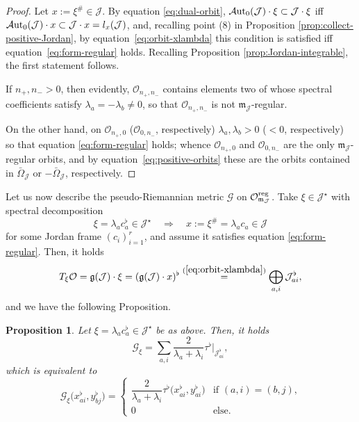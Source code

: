 \documentclass[10pt,a4paper]{amsart}
\numberwithin{equation}{section}
\newtheorem{Proposition}[Theorem]{Proposition}
 { \theoremstyle{definition}
\newtheorem{Definition}[Theorem]{Definition}
\newtheorem{Note}[Theorem]{Note}
\newtheorem{Example}[Theorem]{Example}
\newtheorem{Remark}[Theorem]{Remark} }
\newcommand{\be}{\begin{equation}}
\newcommand{\ee}{\end{equation}}
\newcommand{\Aut}{\mathcal{A}{\rm ut}}
\newcommand{\ocal}{\mathcal{O}}
\newcommand{\Jcal}{\mathcal{J}}
\newcommand{\m}{\mathfrak{m}}
\renewcommand{\m}{{\mathfrak m}}
\newcommand{\Gcal}{\mathcal{G}}
\begin{document}
\begin{proof}
Let $x := \xi^\# \in \Jcal$.
By equation \eqref{eq:dual-orbit}, $\Aut_0(\Jcal) \cdot \xi \subset \Jcal \cdot \xi$ iff $\Aut_0(\Jcal) \cdot x \subset \Jcal \cdot x = l_x(\Jcal)$, and, {recalling point (8) in Proposition \ref{prop:collect-positive-Jordan}}, by equation~\eqref{eq:orbit-xlambda} this condition is satisfied iff equation~\eqref{eq:form-regular} holds.
Recalling Proposition \ref{prop:Jordan-integrable}, the first statement follows.

If $n_+, n_- > 0$, then evidently, $\ocal_{n_+, n_-}$ contains elements two of whose spectral coefficients satisfy $\lambda_a = - \lambda_b \neq 0$, so that $\ocal_{n_+, n_-}$ is not $\m_\Jcal$-regular.

On the other hand, on $\ocal_{n_+, 0}$ ($\ocal_{0, n_-}$, respectively) $\lambda_a, \lambda_b > 0$ ($< 0$, respectively) so that equation \eqref{eq:form-regular} holds; whence $\ocal_{n_+, 0}$ and $\ocal_{0, n_-}$ are the only $\m_\Jcal$-regular orbits, and by equation~\eqref{eq:positive-orbits} these are the orbits contained in $\bar \Omega_\Jcal$ or $-\bar \Omega_\Jcal$, respectively.
\end{proof}

Let us now describe the pseudo-Riemannian metric $\Gcal$ on $\ocal^{\rm reg}_{\m_{\Jcal}}$.
Take $\xi\in\Jcal^{\star}$ with spectral decomposition
\be \label{eq:define-xi}
\xi = \lambda_a c_a^\flat \in \Jcal^\star \quad \Rightarrow \quad x := \xi^\# = \lambda_a c_a \in \Jcal
\ee
for some Jordan frame $(c_i)_{i=1}^r$, and assume it satisfies equation \eqref{eq:form-regular}.
Then, it holds
\[%
T_\xi \ocal = \mathfrak{g}(\Jcal) \cdot \xi = (\mathfrak{g}(\Jcal) \cdot x)^\flat \stackrel{(\ref{eq:orbit-xlambda})}= \bigoplus_{a,i} \Jcal_{ai}^\flat,
\]
and we have the following Proposition.

\begin{Proposition} \label{prop:metric-Jordan}
Let $\xi = \lambda_a c_a^\flat \in \Jcal^\star$ be as above.
Then, it holds
\be \label{eq:G-xi}
\Gcal_\xi = \sum_{a,i} \frac2{\lambda_a + \lambda_i} \tau^\flat|_{\Jcal_{ai}^\flat},
\ee
which is equivalent to
\[
\Gcal_\xi\big(x_{ai}^\flat, y_{bj}^\flat\big) = \begin{cases} \dfrac2{\lambda_a + \lambda_i} \tau^\flat\big(x_{ai}^\flat, y_{ai}^\flat\big) & \text{if $(a,i) = (b,j)$,}\\[1mm] 0 & \text{else.} \end{cases}
\]
\end{Proposition}
\end{document}
